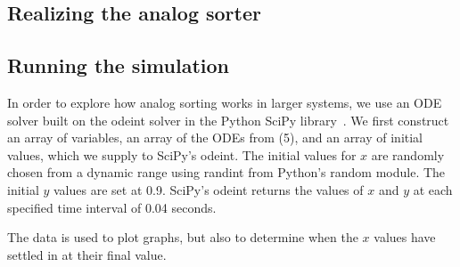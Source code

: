\subsection{Realizing the analog sorter}


\subsection{Running the simulation}
In order to explore how analog sorting works in larger systems, we use an ODE solver built on the odeint solver in the Python SciPy library~\cite{scipy}.
We first construct an array of variables, an array of the ODEs from (5), and an array of initial values, which we supply to SciPy's odeint. The initial values for $x$ are randomly chosen from a dynamic range using randint from Python's random module. The initial $y$ values are set at 0.9. SciPy's odeint returns the values of $x$ and $y$ at each specified time interval of 0.04 seconds. 

The data is used to plot graphs, but also to determine when the $x$ values have settled in at their final value. 




